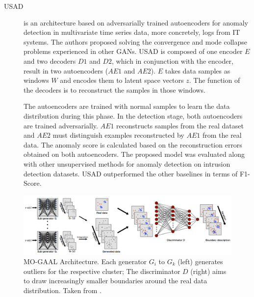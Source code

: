 \begin{description}
    \item[USAD \cite{audibert.etal_USADUnSupervisedAnomaly_2020}] is an architecture based on adversarially trained autoencoders for anomaly detection in multivariate time series data, more concretely, logs from IT systems. The authors proposed solving the convergence and mode collapse problems experienced in other GANs. USAD is composed of one encoder $E$ and two decoders $D1$ and $D2$, which in conjunction with the encoder, result in two autoencoders ($AE1$ and $AE2$). $E$ takes data samples as windows $W$ and encodes them to latent space vectors $z$. The function of the decoders is to reconstruct the samples in those windows. 
    
    The autoencoders are trained with normal samples to learn the data distribution during this phase. In the detection stage, both autoencoders are trained adversarially. $AE1$ reconstructs samples from the real dataset and $AE2$ must distinguish examples reconstructed by $AE1$ from the real data. The anomaly score is calculated based on the reconstruction errors obtained on both autoencoders. The proposed model was evaluated along with other unsupervised methods for anomaly detection on intrusion detection datasets. USAD outperformed the other baselines in terms of F1-Score.
\end{description}

\begin{figure}[htp]
\centering
\includegraphics[width=\textwidth]{figures/moogal_arch.png}
\caption[MO-GAAL Architecture]{MO-GAAL Architecture. Each generator $G_i$ to $G_k$ (left) generates outliers for the respective cluster; The discriminator $D$ (right) aims to draw increasingly smaller boundaries around the real data distribution. Taken from \cite{liu.etal_GenerativeAdversarialActive_2020}.}
\label{fig:mo_gaal_arch}
\end{figure}

